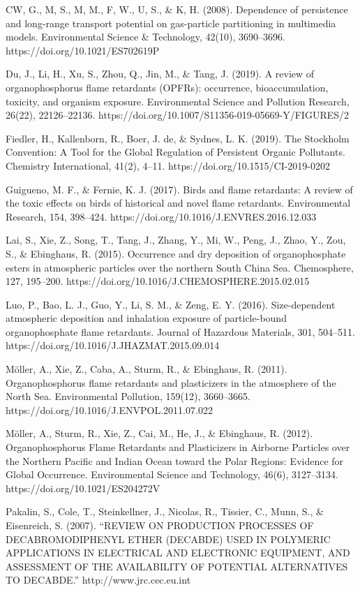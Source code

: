 \documentclass[journal=jacsat,manuscript=article]{achemso}
\begin{document}
CW, G., M, S., M, M., F, W., U, S., \& K, H. (2008). Dependence of
persistence and long-range transport potential on gas-particle
partitioning in multimedia models. Environmental Science \& Technology,
42(10), 3690--3696. https://doi.org/10.1021/ES702619P

Du, J., Li, H., Xu, S., Zhou, Q., Jin, M., \& Tang, J. (2019). A review
of organophosphorus flame retardants (OPFRs): occurrence,
bioaccumulation, toxicity, and organism exposure. Environmental Science
and Pollution Research, 26(22), 22126--22136.
https://doi.org/10.1007/S11356-019-05669-Y/FIGURES/2

Fiedler, H., Kallenborn, R., Boer, J. de, \& Sydnes, L. K. (2019). The
Stockholm Convention: A Tool for the Global Regulation of Persistent
Organic Pollutants. Chemistry International, 41(2), 4--11.
https://doi.org/10.1515/CI-2019-0202

Guigueno, M. F., \& Fernie, K. J. (2017). Birds and flame retardants: A
review of the toxic effects on birds of historical and novel flame
retardants. Environmental Research, 154, 398--424.
https://doi.org/10.1016/J.ENVRES.2016.12.033

Lai, S., Xie, Z., Song, T., Tang, J., Zhang, Y., Mi, W., Peng, J., Zhao,
Y., Zou, S., \& Ebinghaus, R. (2015). Occurrence and dry deposition of
organophosphate esters in atmospheric particles over the northern South
China Sea. Chemosphere, 127, 195--200.
https://doi.org/10.1016/J.CHEMOSPHERE.2015.02.015

Luo, P., Bao, L. J., Guo, Y., Li, S. M., \& Zeng, E. Y. (2016).
Size-dependent atmospheric deposition and inhalation exposure of
particle-bound organophosphate flame retardants. Journal of Hazardous
Materials, 301, 504--511. https://doi.org/10.1016/J.JHAZMAT.2015.09.014

Möller, A., Xie, Z., Caba, A., Sturm, R., \& Ebinghaus, R. (2011).
Organophosphorus flame retardants and plasticizers in the atmosphere of
the North Sea. Environmental Pollution, 159(12), 3660--3665.
https://doi.org/10.1016/J.ENVPOL.2011.07.022

Möller, A., Sturm, R., Xie, Z., Cai, M., He, J., \& Ebinghaus, R.
(2012). Organophosphorus Flame Retardants and Plasticizers in Airborne
Particles over the Northern Pacific and Indian Ocean toward the Polar
Regions: Evidence for Global Occurrence. Environmental Science and
Technology, 46(6), 3127--3134. https://doi.org/10.1021/ES204272V

Pakalin, S., Cole, T., Steinkellner, J., Nicolas, R., Tissier, C., Munn,
S., \& Eisenreich, S. (2007). ``REVIEW ON PRODUCTION PROCESSES OF
DECABROMODIPHENYL ETHER (DECABDE) USED IN POLYMERIC APPLICATIONS IN
ELECTRICAL AND ELECTRONIC EQUIPMENT, AND ASSESSMENT OF THE AVAILABILITY
OF POTENTIAL ALTERNATIVES TO DECABDE.'' http://www.jrc.cec.eu.int
\end{document}
